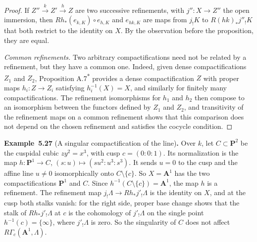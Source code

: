 \documentclass[11pt]{article}
\newenvironment{bpstatement}[2]{\par\addvspace{0.6\baselineskip}\noindent\textbf{#1}#2\textbf{.}\enspace\ignorespaces}
  {\par\addvspace{0.4\baselineskip}}
\newcommand{\bpout}[1]{#1\textsuperscript{\hyperlink{bp-outside}{\ensuremath{\ast}}}}
\begin{document}
\begin{proof}[{Proof}]
If \(Z''\xrightarrow{k}Z'\xrightarrow{h}Z\) are two successive refinements, with \(j'':X\to Z''\) the open immersion, then \(Rh_*(e_{k,K})\circ e_{h,K}\) and \(e_{hk,K}\) are maps from \(j_!K\) to \(R(hk)_*j''_!K\) that both restrict to the identity on \(X\). By the observation before the proposition, they are equal.

\emph{Common refinements.} Two arbitrary compactifications need not be related by a refinement, but they have a common one. Indeed, given dense compactifications \(Z_1\) and \(Z_2\), Proposition \bpout{A.7} provides a dense compactification \(Z\) with proper maps \(h_i:Z\to Z_i\) satisfying \(h_i^{-1}(X)=X\), and similarly for finitely many compactifications. The refinement isomorphisms for \(h_1\) and \(h_2\) then compose to an isomorphism between the functors defined by \(Z_1\) and \(Z_2\), and transitivity of the refinement maps on a common refinement shows that this comparison does not depend on the chosen refinement and satisfies the cocycle condition.
\end{proof}

\label{bp494}%
\begin{bpstatement}{Example~5.27}{ (A singular compactification of the line)}
Over \(k\), let \(C\subset\mathbf P^2\) be the cuspidal cubic \(zy^2=x^3\), with cusp \(c=(0:0:1)\). Its normalization is the map \(h:\mathbf P^1\to C\), \((s:u)\mapsto(su^2:u^3:s^3)\). It sends \(u=0\) to the cusp and the affine line \(u\neq0\) isomorphically onto \(C\setminus\{c\}\). So \(X=\mathbf A^1\) has the two compactifications \(\mathbf P^1\) and \(C\). Since \(h^{-1}(C\setminus\{c\})=\mathbf A^1\), the map \(h\) is a refinement. The refinement map \(j_!\Lambda\to Rh_*j'_!\Lambda\) is the identity on \(X\), and at the cusp both stalks vanish: for the right side, proper base change shows that the stalk of \(Rh_*j'_!\Lambda\) at \(c\) is the cohomology of \(j'_!\Lambda\) on the single point \(h^{-1}(c)=\{\infty\}\), where \(j'_!\Lambda\) is zero. So the singularity of \(C\) does not affect \(R\Gamma_c(\mathbf A^1,\Lambda)\).
\end{bpstatement}
\end{document}
